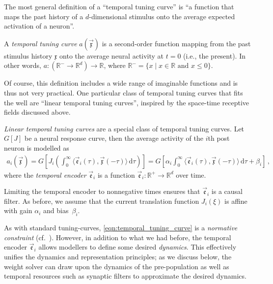 The most general definition of a \enquote{temporal tuning curve} is \enquote{a function that maps the past history of a $d$-dimensional stimulus onto the average expected activation of a neuron}.

\begin{definition}
	\label{def:temporal_tuning_curve}
	A \emph{temporal tuning curve} $a(\vec{\mathfrak{x}})$ is a second-order function mapping from the past stimulus history $\mathfrak{x}$ onto the average neural activity at $t = 0$ (i.e., the present).
	In other words, $a : (\mathbb{R}^- \longrightarrow \mathbb{R}^d) \longrightarrow \mathbb{R}$, where $\mathbb{R}^- = \{ x \mid x \in \mathbb{R} \text{ and } x \leq 0 \}$.
\end{definition}

Of course, this definition includes a wide range of imaginable functions and is thus not very practical.
One particular class of temporal tuning curves that fits the \NEF well are \enquote{linear temporal tuning curves}, inspired by the space-time receptive fields discussed above.

\begin{definition}
	\label{def:linear_temporal_tuning}
	\emph{Linear temporal tuning curves} are a special class of temporal tuning curves.
	Let $G[J]$ be a neural response curve, then the average activity of the $i$th post neuron is modelled as
	\begin{align}
		a_i(\vec{\mathfrak{x}})
			= G\left[ J_i \left( \int_{0}^\infty \!\!\! \big\langle \vec{\mathfrak{e}}_i(\tau), \vec{\mathfrak{x}}(-\tau) \big\rangle 	\,\mathrm{d}\tau \right) \right]
		= G\left[ \alpha_i \! \int_{0}^\infty \!\!\! \big\langle \vec{\mathfrak{e}}_i(\tau), \vec{\mathfrak{x}}(-\tau) \big\rangle \,\mathrm{d}\tau + \beta_i \right] \,,
		\label{eqn:temporal_tuning_curve}
	\end{align}
	where the \emph{temporal encoder} $\vec{\mathfrak{e}}_i$ is a function $\vec{\mathfrak{e}}_i : \mathbb{R}^+ \longrightarrow \mathbb{R}^d$ over time.
\end{definition}
\noindent Limiting the temporal encoder to nonnegative times ensures that $\vec{\mathfrak{e}}_i$ is a causal filter.
As before, we assume that the current translation function $J_i(\xi)$ is affine with gain $\alpha_i$ and bias~$\beta_i$.

As with standard tuning-curves, \cref{eqn:temporal_tuning_curve} is a \emph{normative constraint} (cf.~).
However, in addition to what we had before, the temporal encoder $\vec{\mathfrak{e}}_i$ allows modellers to define some desired \emph{dynamics}.
This effectively unifies the \NEF dynamics and representation principles; as we discuss below, the weight solver can draw upon the dynamics of the pre-population as well as temporal resources such as synaptic filters to approximate the desired dynamics.

